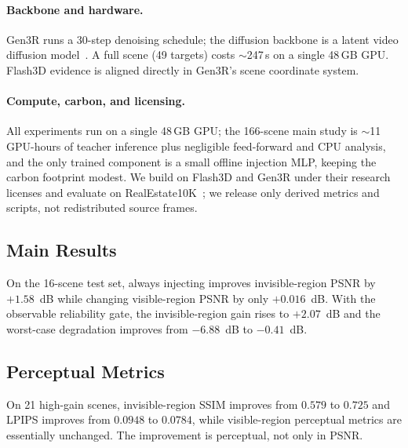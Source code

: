 \documentclass[10pt,twocolumn,letterpaper]{article}
\begin{document}
\paragraph{Backbone and hardware.} Gen3R runs a 30-step denoising schedule; the
diffusion backbone is a latent video diffusion model~\cite{ldm}. A full scene
(49 targets) costs $\sim$247\,s on a single 48\,GB GPU. Flash3D evidence is
aligned directly in Gen3R's scene coordinate system.

\paragraph{Compute, carbon, and licensing.} All experiments run on a single
48\,GB GPU; the 166-scene main study is $\sim$11 GPU-hours of teacher inference
plus negligible feed-forward and CPU analysis, and the only trained component is
a small offline injection MLP, keeping the carbon footprint modest. We build on
Flash3D and Gen3R under their research licenses and evaluate on
RealEstate10K~\cite{realestate10k}; we release only derived metrics and scripts,
not redistributed source frames.

\subsection{Main Results}
\label{sec:main}
On the 16-scene test set, always injecting improves invisible-region PSNR by
$+1.58$~dB while changing visible-region PSNR by only $+0.016$~dB. With the
observable reliability gate, the invisible-region gain rises to $+2.07$~dB and
the worst-case degradation improves from $-6.88$~dB to $-0.41$~dB.

\subsection{Perceptual Metrics}
\label{sec:perceptual}
On 21 high-gain scenes, invisible-region SSIM improves from $0.579$ to $0.725$
and LPIPS improves from $0.0948$ to $0.0784$, while visible-region perceptual
metrics are essentially unchanged. The improvement is perceptual, not only in
PSNR.
\end{document}
